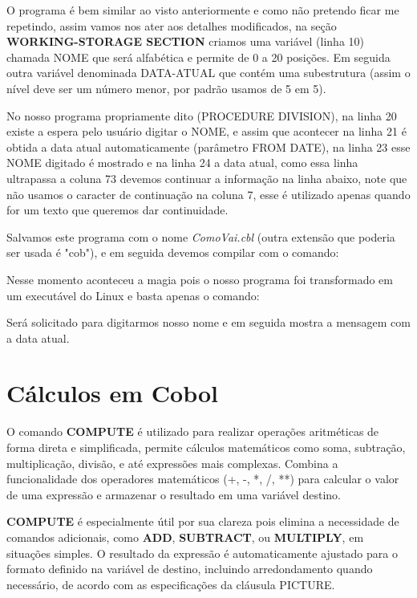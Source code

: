 O programa é bem similar ao visto anteriormente e como  não pretendo ficar me repetindo, assim vamos nos ater aos detalhes modificados, na seção \textbf{WORKING-STORAGE SECTION} criamos uma variável (linha 10) chamada NOME que será alfabética e permite de 0 a 20 posições. Em seguida outra variável denominada DATA-ATUAL que contém uma subestrutura (assim o nível deve ser um número menor, por padrão usamos de 5 em 5).

No nosso programa propriamente dito (PROCEDURE DIVISION), na linha 20 existe a espera pelo usuário digitar o NOME, e assim que acontecer na linha 21 é obtida a data atual automaticamente (parâmetro FROM DATE), na linha 23 esse NOME digitado é mostrado e na linha 24 a data atual, como essa linha ultrapassa a coluna 73 devemos continuar a informação na linha abaixo, note que não usamos o caracter de continuação na coluna 7, esse é utilizado apenas quando for um texto que queremos dar continuidade.

Salvamos este programa com o nome \textit{ComoVai.cbl} (outra extensão que poderia ser usada é "cob"), e em seguida devemos compilar com o comando: \\

Nesse momento aconteceu a magia pois o nosso programa foi transformado em um executável do Linux e basta apenas o comando: \\

Será solicitado para digitarmos nosso nome e em seguida mostra a mensagem com a data atual.

\section{Cálculos em Cobol}
O comando \textbf{COMPUTE} é utilizado para realizar operações aritméticas de forma direta e simplificada, permite cálculos matemáticos como soma, subtração, multiplicação, divisão, e até expressões mais complexas. Combina a funcionalidade dos operadores matemáticos (+, -, *, /, **) para calcular o valor de uma expressão e armazenar o resultado em uma variável destino. 

\textbf{COMPUTE} é especialmente útil por sua clareza pois elimina a necessidade de comandos adicionais, como \textbf{ADD}, \textbf{SUBTRACT}, ou \textbf{MULTIPLY}, em situações simples. O resultado da expressão é automaticamente ajustado para o formato definido na variável de destino, incluindo arredondamento quando necessário, de acordo com as especificações da cláusula PICTURE.

